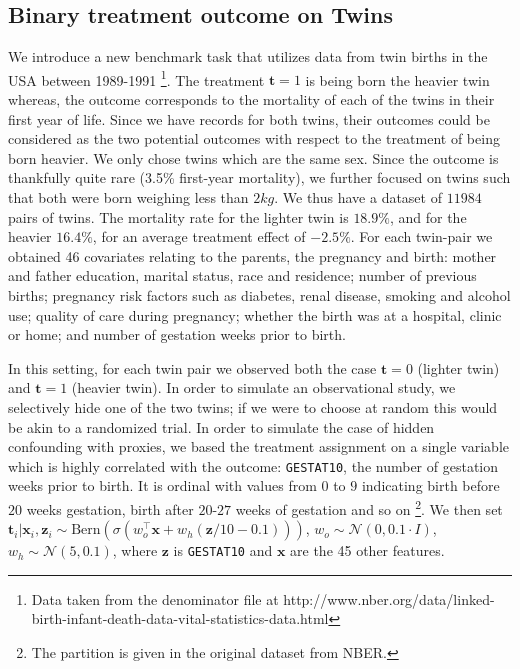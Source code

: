 \documentclass{article}
\def\*#1{\mathbf{#1}}
\begin{document}
\subsection{Binary treatment outcome on Twins}
We introduce a new benchmark task that utilizes data from twin births in the USA between 1989-1991 \citep{almond2005costs} \footnote{Data taken from the denominator file at http://www.nber.org/data/linked-birth-infant-death-data-vital-statistics-data.html}. The treatment $\*t=1$ is being born the heavier twin whereas, the outcome corresponds to the mortality of each of the twins in their first year of life. Since we have records for both twins, their outcomes could be considered as the two potential outcomes with respect to the treatment of being born heavier. We only chose twins which are the same sex. Since the outcome is thankfully quite rare (3.5\% first-year mortality), we further focused on twins such that both were born weighing less than $2kg$. We thus have a dataset of $11984$ pairs of twins. The mortality rate for the lighter twin is $18.9\%$, and for the heavier $16.4\%$, for an average treatment effect of $-2.5\%$. For each twin-pair we obtained 46 covariates relating to the parents, the pregnancy and birth: mother and father education, marital status, race and residence; number of previous births; pregnancy risk factors such as diabetes, renal disease, smoking and alcohol use; quality of care during pregnancy; whether the birth was at a hospital, clinic or home; and number of gestation weeks prior to birth. 

In this setting, for each twin pair we observed both the case $\*t=0$ (lighter twin) and $\*t=1$ (heavier twin). In order to simulate an observational study, we selectively hide one of the two twins; if we were to choose at random this would be akin to a randomized trial. In order to simulate the case of hidden confounding with proxies, we based the treatment assignment on a single variable which is highly correlated with the outcome: \texttt{GESTAT10}, the number of gestation weeks prior to birth. It is ordinal with values from $0$ to $9$ indicating birth before $20$ weeks gestation, birth after $20$-$27$ weeks of gestation and so on \footnote{The partition is given in the original dataset from NBER.}. 
We then set $ \*t_i |\*x_i, \*z_i \sim \text{Bern}\left(\sigma(w_o^\top \*x +w_h (\*z/10-0.1))\right)$, $w_o \sim \mathcal{N}(0,0.1 \cdot I)$, $w_h \sim \mathcal{N}(5,0.1)$, where $\*z$ is \texttt{GESTAT10} and $\*x$ are the 45 other features.
\end{document}
